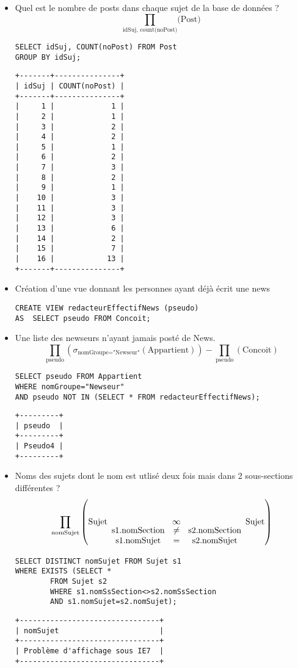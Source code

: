 \bigskip
\begin{itemize} 
	\item Quel est le nombre de posts dans chaque sujet de la base de données ?
		\[\prod_{\text{idSuj, count(noPost)}} \text{(Post)}\]
	\begin{verbatim}
SELECT idSuj, COUNT(noPost) FROM Post
GROUP BY idSuj;
	\end{verbatim}
\begin{verbatim} 
+-------+---------------+
| idSuj | COUNT(noPost) |
+-------+---------------+
|     1 |             1 |
|     2 |             1 |
|     3 |             2 |
|     4 |             2 |
|     5 |             1 |
|     6 |             2 |
|     7 |             3 |
|     8 |             2 |
|     9 |             1 |
|    10 |             3 |
|    11 |             3 |
|    12 |             3 |
|    13 |             6 |
|    14 |             2 |
|    15 |             7 |
|    16 |            13 |
+-------+---------------+
\end{verbatim}


	\item Création d'une vue donnant les personnes ayant déjà écrit une news
		\begin{verbatim}
CREATE VIEW redacteurEffectifNews (pseudo)
AS	SELECT pseudo FROM Concoit;
		\end{verbatim}

	\item Une liste des newseurs n'ayant jamais posté de News.
	\[\prod_{\text{pseudo}}\left( \sigma_{\text{nomGroupe="Newseur"}}(\text{Appartient})\right)-\prod_{\text{pseudo}}(\text{Concoit})\]
		\begin{verbatim}
SELECT pseudo FROM Appartient
WHERE nomGroupe="Newseur"
AND pseudo NOT IN (SELECT * FROM redacteurEffectifNews);
		\end{verbatim}
\begin{verbatim}
+---------+
| pseudo  |
+---------+
| Pseudo4 |
+---------+
\end{verbatim}

	\item Noms des sujets dont le nom est utlisé deux fois mais dans 2 sous-sections différentes ?
	\[\prod_{\text{nomSujet}} \left( \text{Sujet} \underset{\begin{array}{c c c}\text{s1.nomSection}&\neq&\text{s2.nomSection} \\ \text{s1.nomSujet}&=&\text{s2.nomSujet} \end{array}}{\infty} \text{Sujet}\right)\]
		\begin{verbatim}
SELECT DISTINCT nomSujet FROM Sujet s1
WHERE EXISTS (SELECT *
		FROM Sujet s2
		WHERE s1.nomSsSection<>s2.nomSsSection
		AND s1.nomSujet=s2.nomSujet);
		\end{verbatim}
\begin{verbatim}
+--------------------------------+
| nomSujet                       |
+--------------------------------+
| Problème d'affichage sous IE7  |
+--------------------------------+
\end{verbatim}


\end{itemize}

